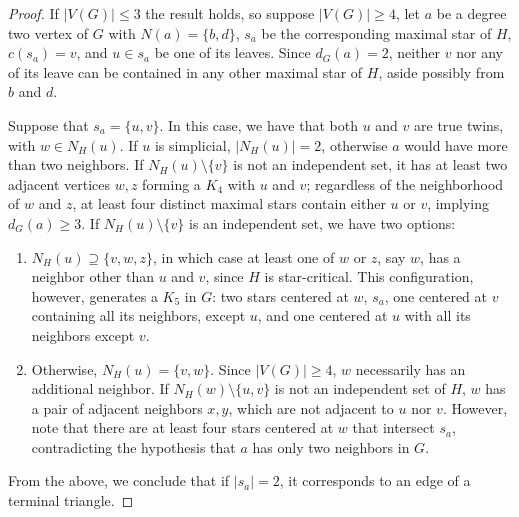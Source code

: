 \begin{proof}
    If $|V(G)| \leq 3$ the result holds, so suppose $|V(G)| \geq 4$, let $a$ be a degree two vertex of $G$ with $N(a) = \{b,d\}$, $s_a$ be the corresponding maximal star of $H$, $c(s_a) = v$, and $u \in s_a$ be one of its leaves.
    Since $d_G(a) = 2$, neither $v$ nor any of its leave can be contained in any other maximal star of $H$, aside possibly from $b$ and $d$.
    
    Suppose that $s_a = \{u,v\}$.
    In this case, we have that both $u$ and $v$ are true twins, with $w \in N_H(u)$.
    If $u$ is simplicial, $|N_H(u)| = 2$, otherwise $a$ would have more than two neighbors.
    If $N_H(u) \setminus \{v\}$ is not an independent set, it has at least two adjacent vertices $w,z$ forming a $K_4$ with $u$ and $v$; regardless of the neighborhood of $w$ and $z$, at least four distinct maximal stars contain either $u$ or $v$, implying $d_G(a) \geq 3$.
    If $N_H(u) \setminus \{v\}$ is an independent set, we have two options:
    \begin{enumerate}
        \item $N_H(u) \supseteq \{v,w,z\}$, in which case at least one of $w$ or $z$, say $w$, has a neighbor other than $u$ and $v$, since $H$ is star-critical. This configuration, however, generates a $K_5$ in $G$: two stars centered at $w$, $s_a$, one centered at $v$ containing all its neighbors, except $u$, and one centered at $u$ with all its neighbors except $v$.
        \item Otherwise, $N_H(u) = \{v,w\}$. Since $|V(G)| \geq 4$, $w$ necessarily has an additional neighbor. If $N_H(w) \setminus \{u,v\}$ is not an independent set of $H$, $w$ has a pair of adjacent neighbors $x,y$, which are not adjacent to $u$ nor $v$.
        However, note that there are at least four stars centered at $w$ that intersect $s_a$, contradicting the hypothesis that $a$ has only two neighbors in $G$.
   \end{enumerate}
   From the above, we conclude that if $|s_a| = 2$, it corresponds to an edge of a terminal triangle.
   

\end{proof}
